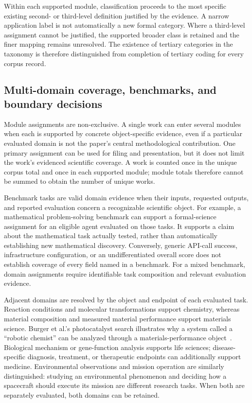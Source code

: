 Within each supported module, classification proceeds to the most specific existing second- or third-level definition justified by the evidence. A narrow application label is not automatically a new formal category. Where a third-level assignment cannot be justified, the supported broader class is retained and the finer mapping remains unresolved. The existence of tertiary categories in the taxonomy is therefore distinguished from completion of tertiary coding for every corpus record.

\subsection{Multi-domain coverage, benchmarks, and boundary decisions}

Module assignments are non-exclusive. A single work can enter several modules when each is supported by concrete object-specific evidence, even if a particular evaluated domain is not the paper's central methodological contribution. One primary assignment can be used for filing and presentation, but it does not limit the work's evidenced scientific coverage. A work is counted once in the unique corpus total and once in each supported module; module totals therefore cannot be summed to obtain the number of unique works.

Benchmark tasks are valid domain evidence when their inputs, requested outputs, and reported evaluation concern a recognizable scientific object. For example, a mathematical problem-solving benchmark can support a formal-science assignment for an eligible agent evaluated on those tasks. It supports a claim about the mathematical task actually tested, rather than automatically establishing new mathematical discovery. Conversely, generic API-call success, infrastructure configuration, or an undifferentiated overall score does not establish coverage of every field named in a benchmark. For a mixed benchmark, domain assignments require identifiable task composition and relevant evaluation evidence.

Adjacent domains are resolved by the object and endpoint of each evaluated task. Reaction conditions and molecular transformations support chemistry, whereas material composition and measured material performance support materials science. Burger et al.'s photocatalyst search illustrates why a system called a ``robotic chemist'' can be analyzed through a materials-performance object~\cite{burger2020}. Biological mechanism or gene-function analysis supports life sciences; disease-specific diagnosis, treatment, or therapeutic endpoints can additionally support medicine. Environmental observations and mission operation are similarly distinguished: studying an environmental phenomenon and deciding how a spacecraft should execute its mission are different research tasks. When both are separately evaluated, both domains can be retained.

